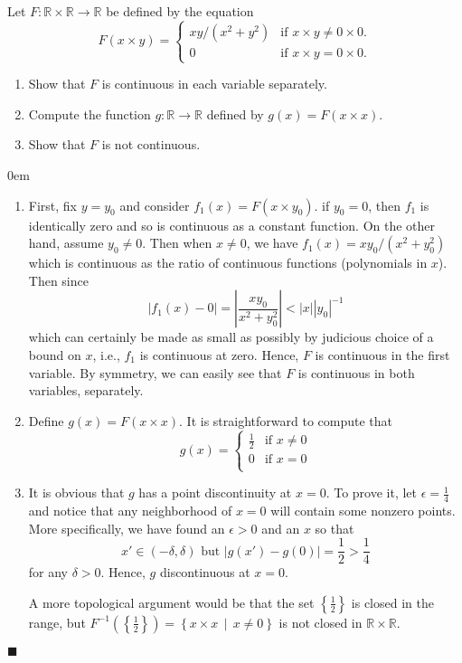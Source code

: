\documentclass[12pt]{article}
\renewcommand{\qed}{\hfill$\blacksquare$}
\renewenvironment{proof}{\begin{addmargin}[1em]{0em}\begin{newproof}}{\end{newproof}\end{addmargin}\qed}
\newenvironment{problem}[2][Exercise]{\begin{trivlist}
\item[\hskip \labelsep {\bfseries #1}\hskip \labelsep {\bfseries #2.}]}{\end{trivlist}}
\begin{document}
\begin{problem}{18.12}
Let $F:\mathbb{R}\times \mathbb{R} \rightarrow \mathbb{R}$ be defined by the equation $$ F\left(x\times y\right) = \left\{ \begin{array}{ll}
xy/\left(x^2+y^2\right) & \text{if }x\times y \neq 0\times 0.\\
0 & \text{if }x\times y = 0 \times 0.
\end{array}\right. $$	
\begin{enumerate}[label=(\alph*)]
	\item Show that $F$ is continuous in each variable separately.
	\item Compute the function $g:\mathbb{R}\rightarrow \mathbb{R}$ defined by $g\left(x\right)=F\left(x\times x\right)$.
	\item Show that $F$ is not continuous.
\end{enumerate}
\end{problem}
\begin{proof}
\begin{enumerate}[label=(\alph*)]
	\item First, fix $y=y_0$ and consider $f_1\left(x\right) = F\left(x\times y_0\right)$. if $y_0=0$, then $f_1$ is identically zero and so is continuous as a constant function. On the other hand, assume $y_0\neq 0$. Then when $x\neq 0$, we have $f_1\left(x\right) = x y_0 / \left(x^2 + y_0^2\right)$ which is continuous as the ratio of continuous functions (polynomials in $x$). Then since $$ \left| f_1\left(x\right) - 0\right| = \left| \frac{xy_0}{x^2+y_0^2} \right| < \left| x \right| \left| y_0\right|^{-1} $$ which can certainly be made as small as possibly by judicious choice of a bound on $x$, i.e., $f_1$ is continuous at zero. Hence, $F$ is continuous in the first variable. By symmetry, we can easily see that $F$ is continuous in both variables, separately.
	\item Define $g\left(x\right)=F\left(x\times x\right)$. It is straightforward to compute that $$ g\left(x\right) = \left\{ \begin{array}{ll}
	\frac{1}{2} & \text{if }x\neq 0 \\
	0 & \text{if }x = 0 \\
	\end{array}\right. $$
	\item It is obvious that $g$ has a point discontinuity at $x=0$. To prove it, let $\epsilon = \frac{1}{4}$ and notice that any neighborhood of $x=0$ will contain some nonzero points. More specifically, we have found an $\epsilon>0$ and an $x$ so that $$ x' \in \left(-\delta,\delta\right)  \text{ but } \left|g\left(x'\right)-g\left(0\right)\right| = \frac{1}{2} > \frac{1}{4}  $$ for any $\delta>0$. Hence, $g$ discontinuous at $x=0$. 
	
	{\color{red}A more topological argument would be that the set $\left\{\frac{1}{2}\right\}$ is closed in the range, but $F^{-1}\left(\left\{\frac{1}{2}\right\}\right)= \left\{ x\times x\, \middle| \, x \neq 0 \right\}$ is not closed in $\mathbb{R}\times \mathbb{R}$.} 
\end{enumerate}
\end{proof}
\end{document}
